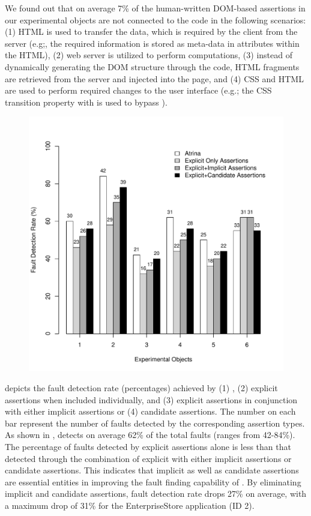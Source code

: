 We found out that on average 7\% of the human-written DOM-based assertions in our experimental objects are not connected to the \javascript code in the following scenarios: (1) HTML is used to transfer the data, which is required by the client from the server (e.g;, the required information is stored as meta-data in attributes within the HTML), (2) web server is utilized to perform computations, (3) instead of dynamically generating the DOM structure through the \javascript code, HTML fragments are retrieved from the server and injected into the page, and (4) CSS and HTML are used to perform required changes to the user interface (e.g.; the CSS transition property with  is used to bypass \javascript).

\begin{figure}[!t]
  \centering
  \includegraphics[width=0.8\hsize]{r-scripts/assertionTypeFaultDetec}
  \vspace{-0.18in} 
  \vspace{-0.3in} 
  \label{Fig:assertionTypeFaultDetec} 
\end{figure}

  depicts the fault detection rate (percentages) achieved by (1) \tool, (2) explicit assertions when included individually, and (3) explicit assertions in conjunction with either implicit assertions or (4) candidate assertions. The number on each bar represent the number of faults detected by the corresponding assertion types. As shown in , \tool detects on average 62\% of the total faults (ranges from 42-84\%).
The percentage of faults detected by explicit assertions alone is less than that detected through the combination of explicit with either implicit assertions or candidate assertions. This indicates that implicit as well as candidate assertions are essential entities in improving the fault finding capability of \tool. By eliminating implicit and candidate assertions, fault detection rate drops 27\% on average, with a maximum drop of 31\% for the EnterpriseStore application (ID 2).

